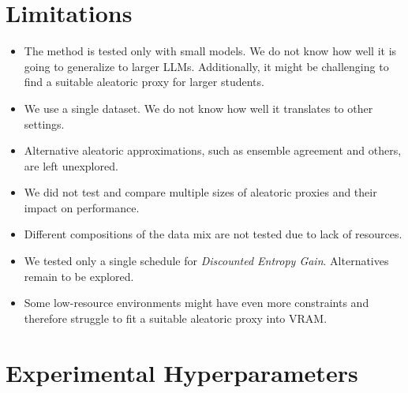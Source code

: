 \documentclass[11pt]{article}
\begin{document}
\section*{Limitations}

\begin{itemize}
  \item The method is tested only with small models. We do not know how well it is going to generalize to larger LLMs. Additionally, it might be challenging to find a suitable aleatoric proxy for larger students.
  \item We use a single dataset. We do not know how well it translates to other settings.
  \item Alternative aleatoric approximations, such as ensemble agreement and others, are left unexplored.
  \item We did not test and compare multiple sizes of aleatoric proxies and their impact on performance.
  \item Different compositions of the data mix are not tested due to lack of resources.
  \item We tested only a single schedule for \emph{Discounted Entropy Gain}. Alternatives remain to be explored.
  \item Some low-resource environments might have even more constraints and therefore struggle to fit a suitable aleatoric proxy into VRAM.
\end{itemize}

%



\appendix

\label{sec:appendix}

\section{Experimental Hyperparameters}
\label{sec:training_hyperparameters}
\end{document}
